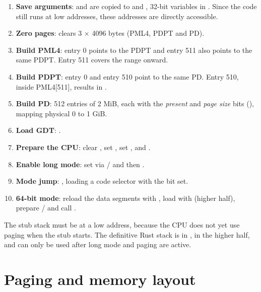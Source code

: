 \begin{enumerate}
  \item \textbf{Save arguments}:  and  are copied
        to  and , 32-bit variables in
        . Since the code still runs at low addresses,
        these addresses are directly accessible.
  \item \textbf{Zero pages}:  clears 3 $\times$ 4096
        bytes (PML4, PDPT and PD).
  \item \textbf{Build PML4}: entry 0 points to the PDPT and entry 511
        also points to the same PDPT. Entry 511 covers the range
         onward.
  \item \textbf{Build PDPT}: entry 0 and entry 510 point to the
        same PD. Entry 510, inside PML4[511], results in
        .
  \item \textbf{Build PD}: 512 entries of 2 MiB, each with the
        \emph{present} and \emph{page size} bits (),
        mapping physical 0 to 1 GiB.
  \item \textbf{Load GDT}: .
  \item \textbf{Prepare the CPU}: clear , set ,
        set ,  and .
  \item \textbf{Enable long mode}: set  via  /
         and then .
  \item \textbf{Mode jump}: ,
        loading a code selector with the  bit set.
  \item \textbf{64-bit mode}: reload the data segments with
        , load  with  (higher half),
        prepare / and call .
\end{enumerate}

\begin{nota}
The stub stack must be at a low address, because the CPU does not yet
use paging when the stub starts. The definitive Rust stack is
in , in the higher half, and can only be used after long mode
and paging are active.
\end{nota}

\section{Paging and memory layout}

